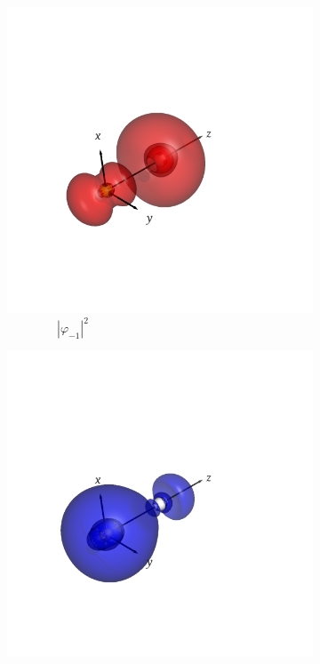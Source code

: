 \documentclass[journal=inoraj,manuscript=article]{achemso}
\begin{document}
\begin{figure}[!h]
    \vspace{0.0cm}
    \begin{subfigure}[t]{0.32\textwidth}
        \centering
        \includegraphics[width=\linewidth]{./AuFl+/nocv-1.png} 
        \caption*{\ \ \ \ \ \ \ \ $|\varphi_{-1}|^2$} 
    \end{subfigure}
    \hfill
    \begin{subfigure}[t]{0.32\textwidth}
        \centering
        \includegraphics[width=\linewidth]{./AuFl+/nocv+1.png} 

\end{subfigure}
\end{figure}
\end{document}
